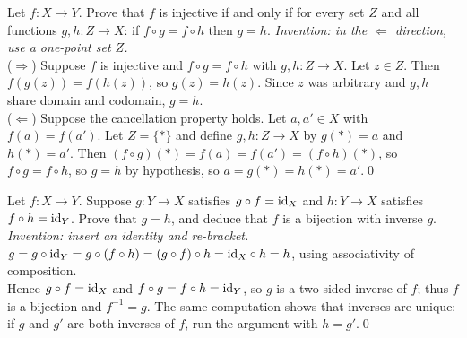 \begin{bexample}
Let $f:X\to Y$. Prove that $f$ is injective if and only if for every set $Z$ and all functions $g,h:Z\to X$: if $f\circ g=f\circ h$ then $g=h$.
\solution
\emph{Invention: in the $\Leftarrow$ direction, use a one-point set $Z$.}\\
($\Rightarrow$) Suppose $f$ is injective and $f\circ g=f\circ h$ with $g,h:Z\to X$. Let $z\in Z$. Then $f(g(z))=f(h(z))$, so $g(z)=h(z)$. Since $z$ was arbitrary and $g,h$ share domain and codomain, $g=h$.\\
($\Leftarrow$) Suppose the cancellation property holds. Let $a,a'\in X$ with $f(a)=f(a')$. Let $Z=\{\ast\}$ and define $g,h:Z\to X$ by $g(\ast)=a$ and $h(\ast)=a'$. Then $(f\circ g)(\ast)=f(a)=f(a')=(f\circ h)(\ast)$, so $f\circ g=f\circ h$, so $g=h$ by hypothesis, so $a=g(\ast)=h(\ast)=a'$.\qed
\end{bexample}

\begin{bexample}
Let $f:X\to Y$. Suppose $g:Y\to X$ satisfies $g\circ f=\mathrm{id}_X$ and $h:Y\to X$ satisfies $f\circ h=\mathrm{id}_Y$. Prove that $g=h$, and deduce that $f$ is a bijection with inverse $g$.
\solution
\emph{Invention: insert an identity and re-bracket.}\\
$g=g\circ\mathrm{id}_Y=g\circ(f\circ h)=(g\circ f)\circ h=\mathrm{id}_X\circ h=h$, using associativity of composition.\\
Hence $g\circ f=\mathrm{id}_X$ and $f\circ g=f\circ h=\mathrm{id}_Y$, so $g$ is a two-sided inverse of $f$; thus $f$ is a bijection and $f^{-1}=g$. The same computation shows that inverses are unique: if $g$ and $g'$ are both inverses of $f$, run the argument with $h=g'$.\qed
\end{bexample}

